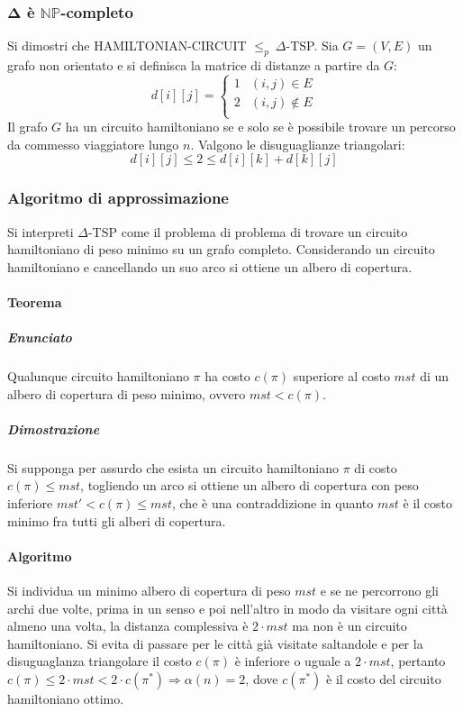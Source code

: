 \subsubsection{$\mathbf{\Delta}$ \`e $\mathbf{\mathbb{NP}}$-completo}
Si dimostri che HAMILTONIAN-CIRCUIT $\le_p\ \Delta$-TSP. Sia $G=(V, E)$ un grafo non orientato e si definisca la matrice di distanze a partire da $G$:
$$d[i][j] = 
\begin{cases}
	1 & (i, j)\in E\\
	2 & (i, j)\not\in E\\
\end{cases}$$
Il grafo $G$ ha un circuito hamiltoniano se e solo se \`e possibile trovare un percorso da commesso viaggiatore lungo $n$. Valgono le disuguaglianze triangolari:
$$d[i][j] \le 2\le d[i][k] + d[k][j]$$
\subsubsection{Algoritmo di approssimazione}
Si interpreti $\Delta$-TSP come il problema di problema di trovare un circuito hamiltoniano di peso minimo su un grafo completo. Considerando un circuito hamiltoniano e cancellando un
suo arco si ottiene un albero di copertura. 
\paragraph{Teorema}
\subparagraph{Enunciato}
Qualunque circuito hamiltoniano $\pi$ ha costo $c(\pi)$ superiore al costo $mst$ di un albero di copertura di peso minimo, ovvero $mst < c(\pi)$.
\subparagraph{Dimostrazione}
Si supponga per assurdo che esista un circuito hamiltoniano $\pi$ di costo $c(\pi)\le mst$, togliendo un arco si ottiene un albero di copertura con peso inferiore $mst' < c(\pi)\le mst$,
che \`e una contraddizione in quanto $mst$ \`e il costo minimo fra tutti gli alberi di copertura. 
\paragraph{Algoritmo}
Si individua un minimo albero di copertura di peso $mst$ e se ne percorrono gli archi due volte, prima in un senso e poi nell'altro in modo da visitare ogni citt\`a almeno una volta, 
la distanza complessiva \`e $2\cdot mst$ ma non \`e un circuito hamiltoniano. Si evita di passare per le citt\`a gi\`a visitate saltandole e per la disuguaglanza triangolare il
costo $c(\pi)$ \`e inferiore o uguale a $2\cdot mst$, pertanto $c(\pi)\le 2\cdot mst< 2\cdot c(\pi^*)\Rightarrow \alpha(n) = 2$, dove $c(\pi^*)$ \`e il costo del circuito hamiltoniano
ottimo. 
